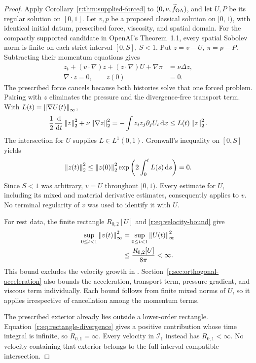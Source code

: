\begin{proof}
Apply Corollary~\ref{r:thm:supplied-forced} to
\((0,\nu,\widetilde f_{\rm OA})\), and let \(U,P\) be its regular solution on
\([0,1]\). Let \(v,p\) be a proposed classical
solution on \([0,1)\), with identical initial datum, prescribed force,
viscosity, and spatial domain. For the compactly supported candidate in
OpenAI's Theorem~1.1, every spatial Sobolev norm is finite on each strict
interval \([0,S]\), \(S<1\). Put \(z=v-U\), \(\pi=p-P\).
Subtracting their momentum equations gives
\begin{equation}
 \begin{aligned}
 z_t+(v\cdot\nabla)z+(z\cdot\nabla)U+\nabla\pi
 &=\nu\Delta z,\\
 \nabla\cdot z=0,\qquad z(0)&=0.
 \end{aligned}
 \label{r:eq:candidate-identification}
\end{equation}
The prescribed force cancels because both histories solve that one forced
problem. Pairing with \(z\) eliminates the pressure and the divergence-free
transport term. With \(L(t)=\left\lVert \nabla U(t)\right\rVert_\infty\),
\[
 \frac12\frac{\,\mathrm d}{\,\mathrm d t}\left\lVert z\right\rVert_2^2+\nu\left\lVert \nabla z\right\rVert_2^2
 =-\int z_i z_j\partial_jU_i\,\mathrm d x
 \le L(t)\left\lVert z\right\rVert_2^2.
\]
The intersection for \(U\) supplies \(L\in L^1(0,1)\). Gronwall's
inequality on \([0,S]\) yields
\[
 \left\lVert z(t)\right\rVert_2^2
 \le\left\lVert z(0)\right\rVert_2^2\exp\left(2\int_0^t L(s)\,\mathrm d s\right)=0.
\]
Since \(S<1\) was arbitrary, \(v=U\) throughout \([0,1)\). Every estimate for \(U\), including its mixed and material
derivative estimates, consequently applies to \(v\). No terminal regularity of \(v\) was used to
identify it with \(U\).

For rest data, the finite rectangle \(R_{0,2}[U]\) and
\eqref{r:eq:velocity-bound} give
\[
 \begin{aligned}
 \sup_{0\le t<1}\left\lVert v(t)\right\rVert_\infty^2
 &=\sup_{0\le t<1}\left\lVert U(t)\right\rVert_\infty^2\\
 &\le\frac{R_{0,2}[U]}{8\pi}<\infty.
 \end{aligned}
\]
This bound excludes the velocity growth in \cite[Theorem~1.1]{openai-paper}.
Section~\ref{r:sec:orthogonal-acceleration} also bounds the acceleration,
transport term, pressure gradient, and viscous term individually.
Each bound follows from finite mixed norms of \(U\), so it applies
irrespective of cancellation among the momentum terms.

The prescribed exterior already lies outside a lower-order rectangle.
Equation~\eqref{r:eq:rectangle-divergence} gives a positive contribution
whose time integral is infinite, so \(R_{0,1}=\infty\).
Every velocity in \(\mathscr I_1\) instead has \(R_{0,1}<\infty\).
No velocity containing that exterior belongs to the full-interval
compatible intersection.


\end{proof}
